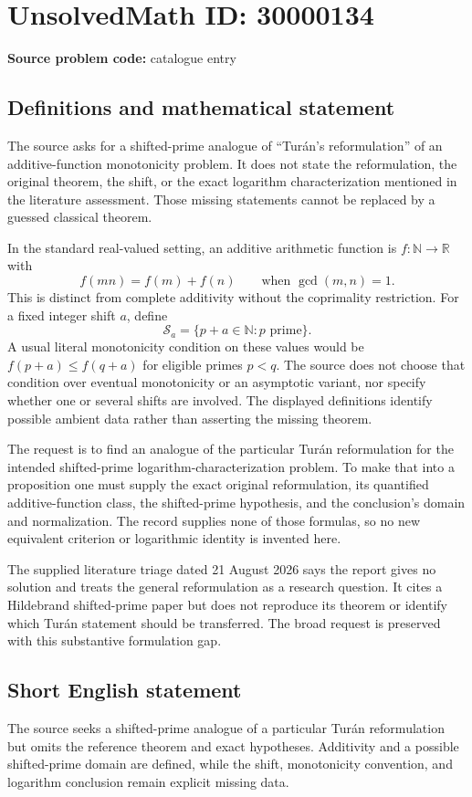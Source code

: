 \documentclass[11pt]{article}
\newcommand{\N}{\mathbb{N}}
\newcommand{\R}{\mathbb{R}}
\begin{document}
\section*{UnsolvedMath ID: 30000134}
\textbf{Source problem code:} catalogue entry
\subsection{Definitions and mathematical statement}
The source asks for a shifted-prime analogue of ``Tur\'an's reformulation'' of an additive-function monotonicity problem. It does not state the reformulation, the original theorem, the shift, or the exact logarithm characterization mentioned in the literature assessment. Those missing statements cannot be replaced by a guessed classical theorem.

In the standard real-valued setting, an additive arithmetic function is \(f:\N\to\R\) with
\[
 f(mn)=f(m)+f(n)\qquad\text{when }\gcd(m,n)=1.
\]
This is distinct from complete additivity without the coprimality restriction. For a fixed integer shift \(a\), define
\[
 \mathcal S_a=\{p+a\in\N:p\text{ prime}\}.
\]
A usual literal monotonicity condition on these values would be \(f(p+a)\leq f(q+a)\) for eligible primes \(p<q\). The source does not choose that condition over eventual monotonicity or an asymptotic variant, nor specify whether one or several shifts are involved. The displayed definitions identify possible ambient data rather than asserting the missing theorem.

The request is to find an analogue of the particular Tur\'an reformulation for the intended shifted-prime logarithm-characterization problem. To make that into a proposition one must supply the exact original reformulation, its quantified additive-function class, the shifted-prime hypothesis, and the conclusion's domain and normalization. The record supplies none of those formulas, so no new equivalent criterion or logarithmic identity is invented here.

The supplied literature triage dated 21 August 2026 says the report gives no solution and treats the general reformulation as a research question. It cites a Hildebrand shifted-prime paper but does not reproduce its theorem or identify which Tur\'an statement should be transferred. The broad request is preserved with this substantive formulation gap.
\subsection{Short English statement}
The source seeks a shifted-prime analogue of a particular Turán reformulation but omits the reference theorem and exact hypotheses. Additivity and a possible shifted-prime domain are defined, while the shift, monotonicity convention, and logarithm conclusion remain explicit missing data.
\end{document}
